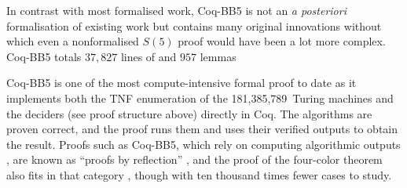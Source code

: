 \documentclass[letterpaper,british,11pt]{article}
\theoremstyle{definition} %
\numberwithin{equation}{section}
\theoremstyle{definition} %
\newcommand{\BBtheFifthTNF}{181{,}385{,}789}
\newcommand{\CoqBB}{Coq-BB5\xspace}
\begin{document}
In contrast with most formalised work, \CoqBB is not an \textit{a posteriori} formalisation of existing work but contains many original innovations without which even a nonformalised $S(5)$ proof would have been a lot more complex. \CoqBB totals $37{,}827$ lines of \Coq and $957$ lemmas%


\CoqBB is one of the most compute-intensive formal proof to date as it implements both the TNF enumeration of the \BBtheFifthTNF\ Turing machines and the deciders (see proof structure above) directly in Coq. The algorithms are proven correct, and the proof runs them and uses their verified outputs to obtain the result. Proofs such as \CoqBB, which rely on computing algorithmic outputs \cite{vmcompute,nativecompute}, are known as ``proofs by reflection'' \cite{boutin1997using}, and the \Coq proof of the four-color theorem also fits in that category \cite{gonthier2010introduction}, though with ten thousand times fewer cases to study.



\end{document}
